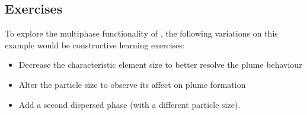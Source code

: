 \subsection{Exercises}
To explore the multiphase functionality of \fluidity, the following variations on this example would be constructive learning exercises:

\begin{itemize}
\item Decrease the characteristic element size to better resolve the plume behaviour
\item Alter the particle size to observe its affect on plume formation
\item Add a second dispersed phase (with a different particle size).
\end{itemize}
